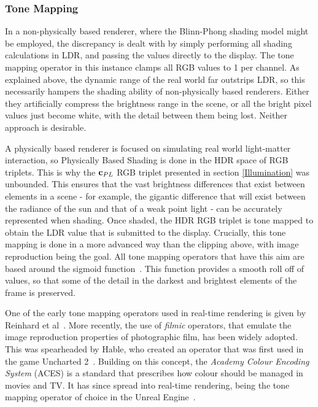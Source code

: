 \subsubsection{Tone Mapping}

In a non-physically based renderer, where the Blinn-Phong shading model might be employed, the discrepancy is dealt with by simply performing all shading calculations in LDR, and passing the values directly to the display. The tone mapping operator in this instance clamps all RGB values to 1 per channel. As explained above, the dynamic range of the real world far outstrips LDR, so this necessarily hampers the shading ability of non-physically based renderers. Either they artificially compress the brightness range in the scene, or all the bright pixel values just become white, with the detail between them being lost. Neither approach is desirable.

A physically based renderer is focused on simulating real world light-matter interaction, so Physically Based Shading is done in the HDR space of RGB triplets. This is why the \begin{math}\mathbf{c}_{PL}\end{math} RGB triplet presented in section \ref{Illumination} was unbounded. This ensures that the vast brightness differences that exist between elements in a scene - for example, the gigantic difference that will exist between the radiance of the sun and that of a weak point light - can be accurately represented when shading. Once shaded, the HDR RGB triplet is tone mapped to obtain the LDR value that is submitted to the display. Crucially, this tone mapping is done in a more advanced way than the clipping above, with image reproduction being the goal. All tone mapping operators that have this aim are based around the sigmoid function~\cite{HoffmanKeynoteEchoChamber}. This function provides a smooth roll off of values, so that some of the detail in the darkest and brightest elements of the frame is preserved.

One of the early tone mapping operators used in real-time rendering is given by Reinhard et al~\cite{Reinhard}. More recently, the use of \textit{filmic} operators, that emulate the image reproduction properties of photographic film, has been widely adopted. This was spearheaded by Hable, who created an operator that was first used in the game Uncharted 2~\cite{Hable}. Building on this concept, the \textit{Academy Colour Encoding System} (ACES) is a standard that prescribes how colour should be managed in movies and TV. It has since spread into real-time rendering, being the tone mapping operator of choice in the Unreal Engine~\cite{ACESUnreal}.

